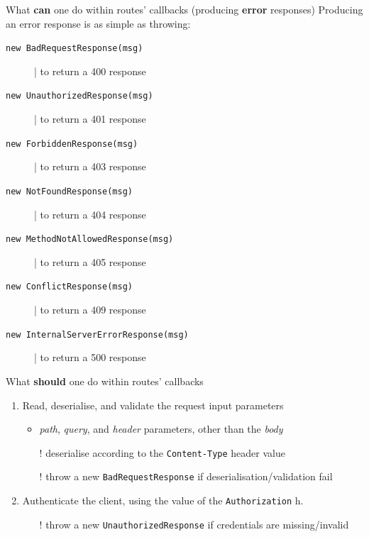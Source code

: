 \documentclass[presentation]{beamer}\mode<presentation>{\usetheme{AMSCesenaPurpleAndGold}}
\begin{document}
\begin{frame}[allowframebreaks]
    \framebreak

    \begin{block}{What \textbf{can} one do within routes' callbacks (producing \textbf{error} responses)}
        Producing an error response is as simple as \alert{throwing}:
        \begin{description}
            \item[\texttt{new BadRequestResponse(msg)}] | to return a 400 response
            \item[\texttt{new UnauthorizedResponse(msg)}] | to return a 401 response
            \item[\texttt{new ForbiddenResponse(msg)}] | to return a 403 response
            \item[\texttt{new NotFoundResponse(msg)}] | to return a 404 response
            \item[\texttt{new MethodNotAllowedResponse(msg)}] | to return a 405 response
            \item[\texttt{new ConflictResponse(msg)}] | to return a 409 response
            \item[\texttt{new InternalServerErrorResponse(msg)}] | to return a 500 response       
        \end{description}
    \end{block}

    \framebreak

    \begin{block}{What \textbf{should} one do within routes' callbacks}
        \begin{enumerate}
            \item Read, deserialise, and validate the request \alert{input} parameters
            \begin{itemize}
                \item \emph{path}, \emph{query}, and \emph{header} parameters, other than the \emph{body}
                \item[!] deserialise according to the \texttt{Content-Type} header value
                \item[!] throw a new \texttt{BadRequestResponse} if deserialisation/validation fail
            \end{itemize}

            \item \alert{Authenticate} the client, using the value of the \texttt{Authorization} h.
            \begin{itemize}
                \item[!] throw a new \texttt{UnauthorizedResponse} if credentials are missing/invalid
            \end{itemize}
            

\end{enumerate}
\end{block}
\end{frame}
\end{document}
